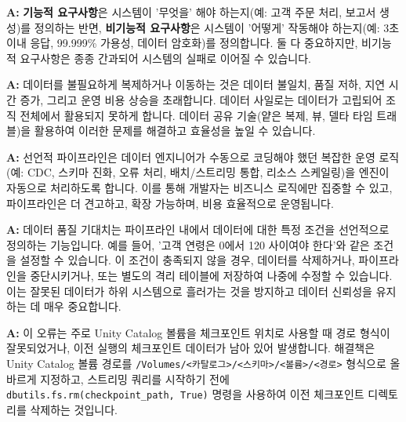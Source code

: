 \documentclass[11pt,a4paper]{article}
\begin{document}
\begin{enumerate}
\begin{tcolorbox}[conceptbox, title={Q: 기능적 요구사항과 비기능적 요구사항의 차이점은 무엇인가요?}]
\textbf{A:} \textbf{기능적 요구사항}은 시스템이 '무엇을' 해야 하는지(예: 고객 주문 처리, 보고서 생성)를 정의하는 반면, \textbf{비기능적 요구사항}은 시스템이 '어떻게' 작동해야 하는지(예: 3초 이내 응답, 99.999\% 가용성, 데이터 암호화)를 정의합니다. 둘 다 중요하지만, 비기능적 요구사항은 종종 간과되어 시스템의 실패로 이어질 수 있습니다.
\end{tcolorbox}

\begin{tcolorbox}[conceptbox, title={Q: 데이터 사일로를 제거하고 데이터 이동을 최소화해야 하는 이유는 무엇인가요?}]
\textbf{A:} 데이터를 불필요하게 복제하거나 이동하는 것은 데이터 불일치, 품질 저하, 지연 시간 증가, 그리고 운영 비용 상승을 초래합니다. 데이터 사일로는 데이터가 고립되어 조직 전체에서 활용되지 못하게 합니다. 데이터 공유 기술(얕은 복제, 뷰, 델타 타임 트래블)을 활용하여 이러한 문제를 해결하고 효율성을 높일 수 있습니다.
\end{tcolorbox}

\begin{tcolorbox}[conceptbox, title={Q: LakeFlow 선언적 파이프라인이 기존 스트리밍 코드보다 어떤 이점이 있나요?}]
\textbf{A:} 선언적 파이프라인은 데이터 엔지니어가 수동으로 코딩해야 했던 복잡한 운영 로직(예: CDC, 스키마 진화, 오류 처리, 배치/스트리밍 통합, 리소스 스케일링)을 엔진이 자동으로 처리하도록 합니다. 이를 통해 개발자는 비즈니스 로직에만 집중할 수 있고, 파이프라인은 더 견고하고, 확장 가능하며, 비용 효율적으로 운영됩니다.
\end{tcolorbox}

\begin{tcolorbox}[conceptbox, title={Q: 데이터 품질 기대치(Expectations)는 어떻게 작동하며, 왜 중요한가요?}]
\textbf{A:} 데이터 품질 기대치는 파이프라인 내에서 데이터에 대한 특정 조건을 선언적으로 정의하는 기능입니다. 예를 들어, '고객 연령은 0에서 120 사이여야 한다'와 같은 조건을 설정할 수 있습니다. 이 조건이 충족되지 않을 경우, 데이터를 삭제하거나, 파이프라인을 중단시키거나, 또는 별도의 격리 테이블에 저장하여 나중에 수정할 수 있습니다. 이는 잘못된 데이터가 하위 시스템으로 흘러가는 것을 방지하고 데이터 신뢰성을 유지하는 데 매우 중요합니다.
\end{tcolorbox}

\begin{tcolorbox}[conceptbox, title={Q: 과제에서 체크포인트 위치 오류가 발생했는데, 어떻게 해결해야 하나요?}]
\textbf{A:} 이 오류는 주로 Unity Catalog 볼륨을 체크포인트 위치로 사용할 때 경로 형식이 잘못되었거나, 이전 실행의 체크포인트 데이터가 남아 있어 발생합니다. 해결책은 Unity Catalog 볼륨 경로를 \texttt{/Volumes/<카탈로그>/<스키마>/<볼륨>/<경로>} 형식으로 올바르게 지정하고, 스트리밍 쿼리를 시작하기 전에 \texttt{dbutils.fs.rm(checkpoint_path, True)} 명령을 사용하여 이전 체크포인트 디렉토리를 삭제하는 것입니다.
\end{tcolorbox}


\end{enumerate}
\end{document}
